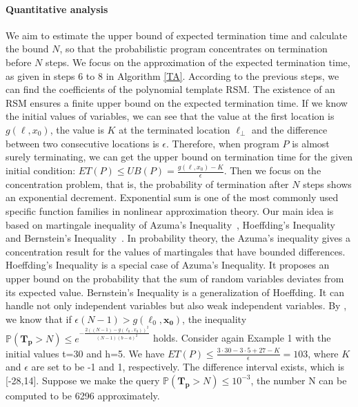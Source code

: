 \documentclass[sigconf,review, anonymous]{acmart}
\begin{document}
\paragraph{Quantitative analysis} We aim to estimate the upper bound of expected termination time and calculate the bound $N$, so that the probabilistic program concentrates on termination before $N$ steps. 
We focus on the approximation of the expected termination time, as given in steps 6 to 8 in Algorithm \ref{TA}. According to the previous steps, we can find the coefficients of the polynomial template RSM. The existence of an RSM ensures a finite upper bound on the expected termination time. If we know the initial values of variables, we can see that the value at the first location is $g(\ell, x_0)$, the value is $K$ at the terminated location $\ell_\bot$ and the difference between two consecutive locations is $\epsilon$.  Therefore, when program $P$ is almost surely terminating, we can get the upper bound on termination time for the given initial condition: $ET(P) \leq UB(P) = \frac{g(\ell, x_0)-K}{\epsilon}$. 
Then we focus on the concentration problem, that is, the probability of termination after $N$ steps shows an exponential decrement. Exponential sum is one of the most commonly used specific function families in nonlinear approximation theory. Our main idea is based on martingale inequality of Azuma's Inequality~\cite{Azuma1967}, Hoeffding's Inequality~\cite{Hoeffding1963,McDiarmid1998Concentration}  and Bernstein's Inequality~\cite{Bennett1962,McDiarmid1998Concentration}. In probability theory, the Azuma's inequality gives a concentration result for the values of martingales that have bounded differences. Hoeffding's Inequality is a special case of Azuma's Inequality. It proposes an upper bound on the probability that the sum of random variables deviates from its expected value. Bernstein's Inequality is a generalization of Hoeffding. It can handle not only independent variables but also weak independent variables. By \cite{cha2015algorithmic}, we know that if $\epsilon(N-1) > g(\ell_0,\boldsymbol{x_0})$, the inequality $\mathbb{P}(\bm{T_p} > N)\leq e^{-\frac{2((N-1)-g(\ell_0,x_0))^2}{(N-1)(b-a)^2}}$ holds. 
Consider again Example 1 with the initial values t=30 and h=5. We have  $ET(P) \leq \frac{3\cdot 30-3\cdot 5+27-K}{\epsilon}=103$, where $K$ and $\epsilon$ are set to be -1 and 1, respectively. The difference interval exists, which is [-28,14]. Suppose we make the query $\mathbb{P}(\bm{T_p} > N)\leq 10^{-3}$, the number N can be computed to be 6296  approximately.
\end{document}
